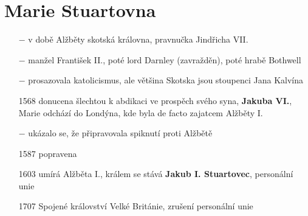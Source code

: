\documentclass{article}
\begin{document}
\section*{Marie Stuartovna}
\begin{itemize}
    \vspace{-0.5em}
    \setlength\itemsep{0.15em}
    \item[$-$] v době Alžběty skotská královna, pravnučka Jindřicha VII.
    \item[$-$] manžel František II., poté lord Darnley (zavražděn), poté hrabě Bothwell
    \item[$-$] prosazovala katolicismus, ale většina Skotska jsou stoupenci Jana Kalvína
    \item[1568] donucena šlechtou k abdikaci ve prospěch svého syna, \textbf{Jakuba VI.}, Marie odchází do Londýna, kde byla de facto zajatcem Alžběty I.
    \item[$-$] ukázalo se, že připravovala spiknutí proti Alžbětě
    \item[1587] popravena
\end{itemize}

\begin{itemize}
    \vspace{-0.5em}
    \setlength\itemsep{0.15em}
    \item[1603] umírá Alžběta I., králem se stává \textbf{Jakub I. Stuartovec}, personální unie
    \item[1707] Spojené království Velké Británie, zrušení personální unie
  \end{itemize}
\end{document}
